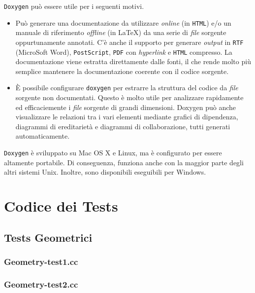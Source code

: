 \texttt{Doxygen} può essere utile per i seguenti motivi.
\begin{itemize}
	\item Può generare una documentazione da utilizzare \textit{online} (in \texttt{HTML}) e/o un manuale di riferimento \textit{offline} (in \LaTeX) da una serie di \textit{file} sorgente oppurtunamente annotati. C'è anche il supporto per generare \textit{output} in \texttt{RTF} (MicroSoft Word), \texttt{PostScript}, \texttt{PDF} con \textit{hyperlink} e \texttt{HTML} compresso. La documentazione viene estratta direttamente dalle fonti, il che rende molto più semplice mantenere la documentazione coerente con il codice sorgente.
	\item È possibile configurare \texttt{doxygen} per estrarre la struttura del codice da \textit{file} sorgente non documentati. Questo è molto utile per analizzare rapidamente ed efficaciemente i \textit{file} sorgente di grandi dimensioni. Doxygen può anche visualizzare le relazioni tra i vari elementi mediante grafici di dipendenza, diagrammi di ereditarietà e diagrammi di collaborazione, tutti generati automaticamente.
\end{itemize}
\texttt{Doxygen} è sviluppato su Mac OS X e Linux, ma è configurato per essere altamente portabile. Di conseguenza, funziona anche con la maggior parte degli altri sistemi Unix. Inoltre, sono disponibili eseguibili per Windows.



\chapter{Codice dei Tests}
\label{TestsCode}
%
\section{Tests Geometrici}
%
\subsection{Geometry-test1.cc}
\renewcommand{\baselinestretch}{1.0}

\renewcommand{\baselinestretch}{1.25}
%
\subsection{Geometry-test2.cc}
\renewcommand{\baselinestretch}{1.0}

\renewcommand{\baselinestretch}{1.25}
%
